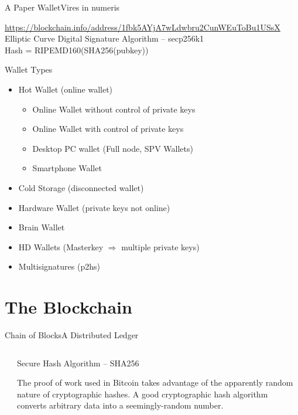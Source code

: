\documentclass[english,compress]{beamer}
\begin{document}
\begin{frame}{A Paper Wallet}{Vires in numeris}
 \vfill
 \begin{tiny}
 \url{https://blockchain.info/address/1fbk5AYjA7wLdwbru2CunWEuToBu1USsX}
 \vfill
 \vfill
 Elliptic Curve Digital Signature Algorithm -- secp256k1 \\
 Hash = RIPEMD160(SHA256(pubkey))
\end{tiny}
\end{frame}


\begin{frame}{Wallet Types}
 \begin{itemize}
  \item Hot Wallet (online wallet)
  \begin{itemize}
    \item Online Wallet without control of private keys	
    \item Online Wallet with control of private keys
    \item Desktop PC wallet (Full node, SPV Wallets)
    \item Smartphone Wallet
  \end{itemize}
  
  \item Cold Storage (disconnected wallet)
  \item Hardware Wallet (private keys not online)
  \item Brain Wallet 
  \item HD Wallets (Masterkey $\Rightarrow$ multiple private keys)
  \item Multisignatures (p2hs)
 \end{itemize}

\end{frame}


\section{The Blockchain}

\begin{frame}{Chain of Blocks}{A Distributed Ledger}
\begin{columns}
 \begin{column}{0.3 \textwidth}
 \end{column}
 \begin{column}{0.6 \textwidth}
 \begin{exampleblock}{\begin{scriptsize}Secure Hash Algorithm -- SHA256\end{scriptsize}}
  \begin{tiny}The proof of work used in Bitcoin takes advantage of the apparently random 
 nature of cryptographic hashes. A good cryptographic
 hash algorithm converts arbitrary data into a seemingly-random number.
 \end{tiny}
 \end{exampleblock}
 \end{column}
 \hfill
\end{columns}
\end{frame}
\end{document}
